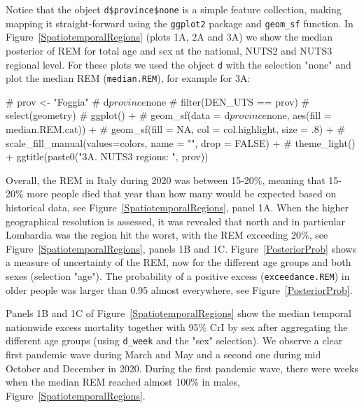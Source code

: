 Notice that the object \texttt{d\$province\$none} is a simple feature collection, making mapping it straight-forward using the \texttt{ggplot2} package and \texttt{geom\_sf} function.
In Figure~\ref{SpatiotemporalRegions} (plots 1A, 2A and 3A) we show the median posterior of REM for total age and sex at the national, NUTS2 and NUTS3 regional level. For these plots we used the object \texttt{d} with the selection "none" and plot the median REM (\texttt{median.REM}), for example for 3A:
\begin{example}
# prov <- "Foggia"
# d$province$none %
#	filter(DEN_UTS == prov) %
#	select(geometry) %
#	ggplot() +  
#		geom_sf(data = d$province$none, aes(fill = median.REM.cat)) + 
#		geom_sf(fill = NA, col = col.highlight, size = .8) + 
#		scale_fill_manual(values=colors, name = "", drop = FALSE) + 
#       theme_light() + ggtitle(paste0("3A. NUTS3 regions: ", prov)) 
\end{example}
			

\noindent Overall, the REM in Italy during 2020 was between 15-20\%, meaning that 15-20\% more people died that year than how many would be expected based on historical data, see Figure~\ref{SpatiotemporalRegions}, panel 1A. When the higher geographical resolution is assessed, it was revealed that north and in particular Lombardia was the region hit the worst, with the REM exceeding $20\%$, see Figure~\ref{SpatiotemporalRegions}, panels 1B and 1C. Figure~\ref{PosteriorProb} shows a measure of uncertainty of the REM, now for the different age groups and both sexes (selection "age"). The probability of a positive excess (\texttt{exceedance.REM}) in older people was larger than 0.95 almost everywhere, see Figure~\ref{PosteriorProb}.
		
Panels 1B and 1C of Figure~\ref{SpatiotemporalRegions} show the median temporal nationwide excess mortality together with 95\% CrI by sex after aggregating the different age groups (using \texttt{d\_week} and the "sex" selection). We observe a clear first pandemic wave during March and May and a second one during mid October and December in 2020. During the first pandemic wave, there were weeks when the median REM reached almost 100\% in males, Figure~\ref{SpatiotemporalRegions}.
		
